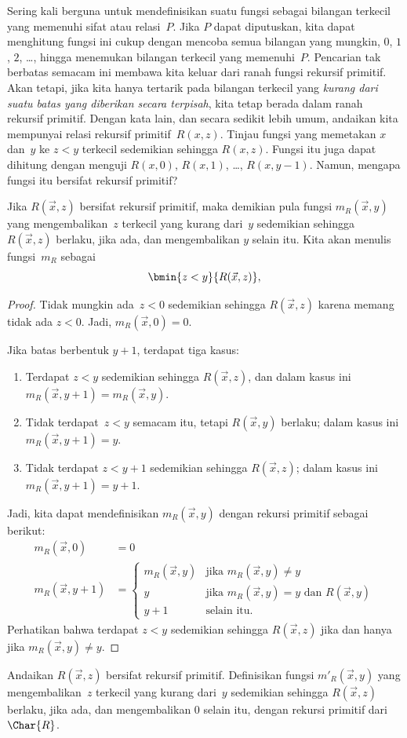 \documentclass[../../../include/open-logic-section]{subfiles}
\begin{document}

\begin{explain}
Sering kali berguna untuk mendefinisikan suatu fungsi sebagai bilangan terkecil
yang memenuhi sifat atau relasi~$P$. Jika $P$ dapat diputuskan, kita dapat
menghitung fungsi ini cukup dengan mencoba semua bilangan yang mungkin,
$0$, $1$, $2$, \dots, hingga menemukan bilangan terkecil yang memenuhi~$P$.
Pencarian tak berbatas semacam ini membawa kita keluar dari ranah fungsi
rekursif primitif. Akan tetapi, jika kita hanya tertarik pada bilangan terkecil
yang \emph{kurang dari suatu batas yang diberikan secara terpisah}, kita tetap
berada dalam ranah rekursif primitif. Dengan kata lain, dan secara sedikit lebih
umum, andaikan kita mempunyai relasi rekursif primitif~$R(x,z)$. Tinjau fungsi
yang memetakan $x$ dan~$y$ ke $z < y$ terkecil sedemikian sehingga $R(x, z)$.
Fungsi itu juga dapat dihitung dengan menguji $R(x, 0)$, $R(x, 1)$, \dots,
$R(x, y-1)$. Namun, mengapa fungsi itu bersifat rekursif primitif?
\end{explain}

\begin{prop}
Jika $R(\vec x, z)$ bersifat rekursif primitif, maka demikian pula fungsi
$m_R(\vec{x}, y)$ yang mengembalikan~$z$ terkecil yang kurang dari~$y$
sedemikian sehingga $R(\vec x, z)$ berlaku, jika ada, dan mengembalikan $y$
selain itu. Kita akan menulis fungsi~$m_R$ sebagai
\[
\bmin{z < y}{R(\vec{x}, z)},
\]
\end{prop}

\begin{proof}
Tidak mungkin ada~$z < 0$ sedemikian sehingga $R(\vec{x}, z)$ karena memang
tidak ada $z < 0$. Jadi, $m_R(\vec x, 0) = 0$.

Jika batas berbentuk $y + 1$, terdapat tiga kasus:
\begin{enumerate}
\item Terdapat $z < y$ sedemikian sehingga $R(\vec{x}, z)$, dan dalam kasus
ini $m_R(\vec{x}, y+1) = m_R(\vec{x}, y)$.
\item Tidak terdapat~$z<y$ semacam itu, tetapi $R(\vec{x}, y)$ berlaku; dalam
kasus ini $m_R(\vec{x}, y+1) = y$.
\item Tidak terdapat $z < y+1$ sedemikian sehingga $R(\vec{x}, z)$; dalam
kasus ini $m_R(\vec{x}, y+1) = y+1$.
\end{enumerate}
Jadi, kita dapat mendefinisikan $m_R(\vec x,y)$ dengan rekursi primitif sebagai berikut:
\begin{align*}
m_R(\vec{x}, 0) & = 0\\
m_R(\vec{x}, y+1) & =
\begin{cases}
m_R(\vec{x}, y) & \text{jika $m_R(\vec x, y) \neq y$}\\
y & \text{jika $m_R(\vec x, y) = y$ dan $R(\vec{x}, y)$}\\
y+1 & \text{selain itu.}
\end{cases}
\end{align*}
Perhatikan bahwa terdapat $z<y$ sedemikian sehingga $R(\vec x, z)$ jika dan
hanya jika $m_R(\vec x, y) \neq y$.
\end{proof}

\begin{prob}
Andaikan $R(\vec x, z)$ bersifat rekursif primitif. Definisikan fungsi
$m'_R(\vec{x}, y)$ yang mengembalikan~$z$ terkecil yang kurang dari~$y$
sedemikian sehingga $R(\vec{x}, z)$ berlaku, jika ada, dan mengembalikan $0$
selain itu, dengan rekursi primitif dari~$\Char{R}$.
\end{prob}
\end{document}
